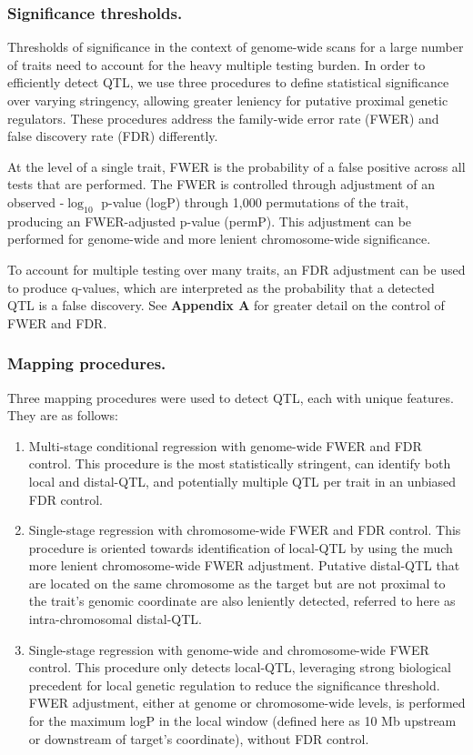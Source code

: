 \subsubsection{Significance thresholds.}
Thresholds of significance in the context of genome-wide scans for a large number of traits need to account for the heavy multiple testing burden. In order to efficiently detect QTL, we use three procedures to define statistical significance over varying stringency, allowing greater leniency for putative proximal genetic regulators. These procedures address the family-wide error rate (FWER) and false discovery rate (FDR) differently.

At the level of a single trait, FWER is the probability of a false positive across all tests that are performed. The FWER is controlled through adjustment of an observed -$\log_{10}$ p-value (logP) through 1,000 permutations of the trait, producing an FWER-adjusted p-value (permP). This adjustment can be performed for genome-wide and more lenient chromosome-wide significance.

To account for multiple testing over many traits, an FDR adjustment \citep{Benjamini1995} can be used to produce q-values, which are interpreted as the probability that a detected QTL is a false discovery. See \textbf{Appendix A} for greater detail on the control of FWER and FDR. 

\subsubsection{Mapping procedures.} Three mapping procedures were used to detect QTL, each with unique features. They are as follows:
\begin{enumerate}[label = \method{{\arabic*:}}]
\setlength{\itemindent}{3em}
	\item Multi-stage conditional regression with genome-wide FWER and FDR control. This procedure is the most statistically stringent, can identify both local and distal-QTL, and potentially multiple QTL per trait in an unbiased FDR control.
    \item Single-stage regression with chromosome-wide FWER and FDR control. This procedure is oriented towards identification of local-QTL by using the much more lenient chromosome-wide FWER adjustment. Putative distal-QTL that are located on the same chromosome as the target but are not proximal to the trait's genomic coordinate are also leniently detected, referred to here as intra-chromosomal distal-QTL.
    \item Single-stage regression with genome-wide and chromosome-wide FWER control. This procedure only detects local-QTL, leveraging strong biological precedent for local genetic regulation to reduce the significance threshold. FWER adjustment, either at genome or chromosome-wide levels, is performed for the maximum logP in the local window (defined here as 10 Mb upstream or downstream of target's coordinate), without FDR control.
\end{enumerate}

